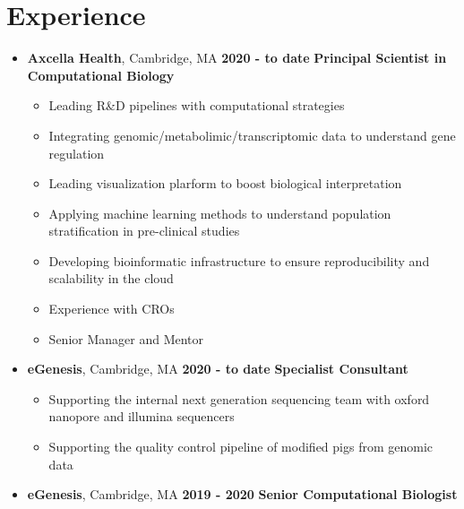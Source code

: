 \hypertarget{experience}{%
\section{Experience}\label{experience}}

\begin{itemize}

\item
\textbf{Axcella Health}, Cambridge, MA \hfill \textbf{2020 - to date}
\newline
\textbf{Principal Scientist in Computational Biology}
\begin{itemize}
\item
  Leading R\&D pipelines with computational strategies
\item
  Integrating genomic/metabolimic/transcriptomic data to understand gene regulation
\item 
  Leading visualization plarform to boost biological interpretation
\item
  Applying machine learning methods to understand population stratification in pre-clinical studies
\item 
  Developing bioinformatic infrastructure to ensure reproducibility and scalability in the cloud
\item
  Experience with CROs
\item
  Senior Manager and Mentor
\end{itemize}

\item
\textbf{eGenesis}, Cambridge, MA \hfill \textbf{2020 - to date}
\newline
\textbf{Specialist Consultant}
\begin{itemize}
\item Supporting the internal next generation sequencing team with oxford nanopore and illumina sequencers
\item Supporting the quality control pipeline of modified pigs from genomic data
\end{itemize}


\item
\textbf{eGenesis}, Cambridge, MA \hfill \textbf{2019 - 2020}
\newline
\textbf{Senior Computational Biologist}
 \begin{itemize}


\end{itemize}
\end{itemize}
